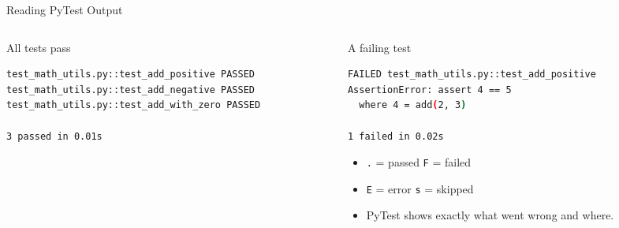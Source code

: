 \begin{frame}{Reading PyTest Output}
\setlength{\leftmargini}{0.5cm}
\begin{columns}[c,t,totalwidth=1.0\textwidth]
\begin{column}[c]{0.49\linewidth}
\begin{block}{All tests pass}
\begin{lstlisting}[style=fullwidth,language=bash,numbers=none]
test_math_utils.py::test_add_positive PASSED
test_math_utils.py::test_add_negative PASSED
test_math_utils.py::test_add_with_zero PASSED

3 passed in 0.01s
\end{lstlisting}
\end{block}
\end{column}
\begin{column}[c]{0.49\linewidth}
\begin{block}{A failing test}
\begin{lstlisting}[style=fullwidth,language=bash,numbers=none]
FAILED test_math_utils.py::test_add_positive
AssertionError: assert 4 == 5
  where 4 = add(2, 3)

1 failed in 0.02s
\end{lstlisting}
\end{block}
\begin{block}{}
\begin{itemize}
\item \texttt{.} = passed \quad \texttt{F} = failed
\item \texttt{E} = error \quad \texttt{s} = skipped
\item PyTest shows exactly what went wrong and where.
\end{itemize}
\end{block}
\end{column}
\end{columns}
\end{frame}

{}
{}
{}

